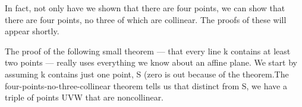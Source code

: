 \begin{isabellebody}
\begin{isamarkuptext}
\begin{hartshorne}
\end{hartshorne}%
\end{isamarkuptext}\isamarkuptrue%
%
\begin{isamarkuptext}%
\spike In fact, not only have we shown that there are four points, we can show
that there are four points, no three of which are collinear. The proofs of these will appear
shortly.%
\end{isamarkuptext}\isamarkuptrue%
%
\begin{isamarkuptext}%
The proof of the following small theorem --- that every line k contains at least two points ---
really uses everything we know about an affine plane. We start by assuming k contains
just one point, S (zero is out because of the  theorem.The four-points-no-three-collinear
theorem tells us that distinct from S, we have a triple of points UVW that are noncollinear. 


\end{isamarkuptext}
\end{isabellebody}
